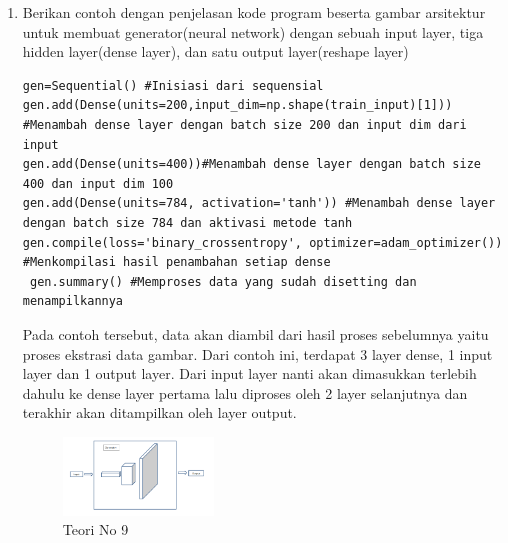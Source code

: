 \begin{enumerate}
            \item Berikan contoh dengan penjelasan kode program beserta gambar arsitektur untuk membuat generator(neural network) dengan sebuah input layer, tiga hidden layer(dense layer), dan satu output layer(reshape layer)
\begin{verbatim}
gen=Sequential() #Inisiasi dari sequensial
gen.add(Dense(units=200,input_dim=np.shape(train_input)[1])) #Menambah dense layer dengan batch size 200 dan input dim dari input
gen.add(Dense(units=400))#Menambah dense layer dengan batch size 400 dan input dim 100
gen.add(Dense(units=784, activation='tanh')) #Menambah dense layer dengan batch size 784 dan aktivasi metode tanh
gen.compile(loss='binary_crossentropy', optimizer=adam_optimizer()) #Menkompilasi hasil penambahan setiap dense
 gen.summary() #Memproses data yang sudah disetting dan menampilkannya
\end{verbatim}    
            \par Pada contoh tersebut, data akan diambil dari hasil proses sebelumnya yaitu proses ekstrasi data gambar. Dari contoh ini, terdapat 3 layer dense, 1 input layer dan 1 output layer. Dari input layer nanti akan dimasukkan terlebih dahulu ke dense layer pertama lalu diproses oleh 2 layer selanjutnya dan terakhir akan ditampilkan oleh layer output.
            \begin{figure}[H]
                \includegraphics[width=4cm]{figures/1174040/chapter8/teori9.png}
                \centering
                  \caption{Teori No 9}
            \end{figure}


\end{enumerate}
